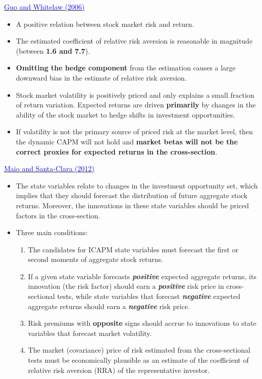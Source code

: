 \documentclass{beamer}
\begin{document}
\begin{frame}{\href{https://doi.org/10.1111/j.1540-6261.2006.00877.x}{\textcolor{blue}{Guo and Whitelaw (2006)}}}
	\begin{itemize}
		\item A positive relation between stock market risk and return.
		\item The estimated coefficient of relative risk aversion is reasonable in magnitude (between \textbf{1.6 and 7.7}).
		\item \textbf{Omitting the hedge component} from the estimation causes a large downward bias in the estimate of relative risk aversion.
		\item Stock market volatility is positively priced and only
		explains a small fraction of return variation. Expected returns are driven \textbf{primarily} by changes in the ability of the stock market to hedge shifts in investment opportunities.
		\item If volatility is not the primary source of priced risk at the market level, then the dynamic CAPM will not hold and \textbf{market betas will not be the correct proxies
		for expected returns in the cross-section}.
	\end{itemize}
\end{frame}

\begin{frame}{\href{https://doi.org/10.1016/j.jfineco.2012.07.001}{\textcolor{blue}{Maio and Santa-Clara (2012)}}}
	\begin{itemize}
		\item The state variables relate to changes in the investment opportunity set, which implies that they should forecast the distribution of future aggregate stock returns. Moreover, the innovations in these state variables should be priced factors in the cross-section.
		\item Three main conditions:
		\begin{enumerate}
			\item  The candidates for ICAPM state variables must forecast the first or second moments of aggregate stock returns.
			\item  If a given state variable forecasts \textit{\textbf{positive}} expected aggregate returns, its innovation (the risk factor) should earn a \textit{\textbf{positive}} risk price in cross-sectional tests, while state variables that forecast \textit{\textbf{negative}} expected aggregate returns should earn a \textit{\textbf{negative}} risk price.
			\item  Risk premiums with \textbf{opposite} signs should accrue to innovations to state variables that forecast market volatility.
			\item The market (covariance) price of risk estimated from the cross-sectional tests must be economically plausible as an estimate of the coefficient of relative risk aversion (RRA) of the representative investor.
		\end{enumerate}
	\end{itemize}
\end{frame}
\end{document}
